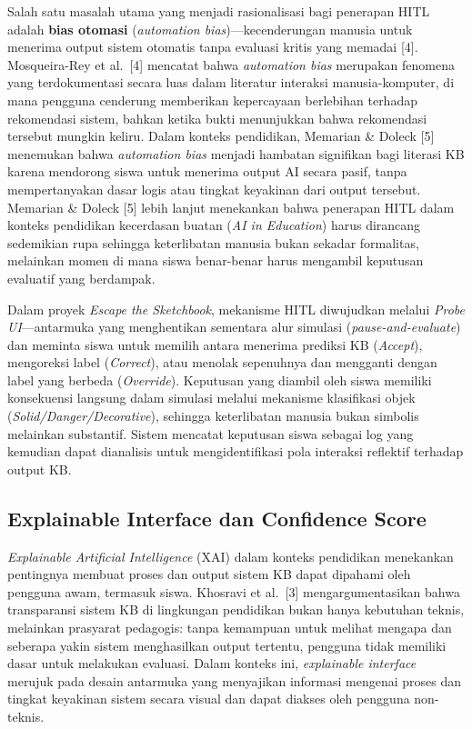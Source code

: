 Salah satu masalah utama yang menjadi rasionalisasi bagi penerapan HITL adalah \textbf{bias otomasi} (\textit{automation bias})---kecenderungan manusia untuk menerima output sistem otomatis tanpa evaluasi kritis yang memadai [4]. Mosqueira-Rey et al.\ [4] mencatat bahwa \textit{automation bias} merupakan fenomena yang terdokumentasi secara luas dalam literatur interaksi manusia-komputer, di mana pengguna cenderung memberikan kepercayaan berlebihan terhadap rekomendasi sistem, bahkan ketika bukti menunjukkan bahwa rekomendasi tersebut mungkin keliru. Dalam konteks pendidikan, Memarian \& Doleck [5] menemukan bahwa \textit{automation bias} menjadi hambatan signifikan bagi literasi KB karena mendorong siswa untuk menerima output AI secara pasif, tanpa mempertanyakan dasar logis atau tingkat keyakinan dari output tersebut. Memarian \& Doleck [5] lebih lanjut menekankan bahwa penerapan HITL dalam konteks pendidikan kecerdasan buatan (\textit{AI in Education}) harus dirancang sedemikian rupa sehingga keterlibatan manusia bukan sekadar formalitas, melainkan momen di mana siswa benar-benar harus mengambil keputusan evaluatif yang berdampak.

Dalam proyek \textit{Escape the Sketchbook}, mekanisme HITL diwujudkan melalui \textit{Probe UI}---antarmuka yang menghentikan sementara alur simulasi (\textit{pause-and-evaluate}) dan meminta siswa untuk memilih antara menerima prediksi KB (\textit{Accept}), mengoreksi label (\textit{Correct}), atau menolak sepenuhnya dan mengganti dengan label yang berbeda (\textit{Override}). Keputusan yang diambil oleh siswa memiliki konsekuensi langsung dalam simulasi melalui mekanisme klasifikasi objek (\textit{Solid/Danger/Decorative}), sehingga keterlibatan manusia bukan simbolis melainkan substantif. Sistem mencatat keputusan siswa sebagai log yang kemudian dapat dianalisis untuk mengidentifikasi pola interaksi reflektif terhadap output KB.

\subsection{Explainable Interface dan Confidence Score}
\label{subsec:explainable-interface}

\textit{Explainable Artificial Intelligence} (XAI) dalam konteks pendidikan menekankan pentingnya membuat proses dan output sistem KB dapat dipahami oleh pengguna awam, termasuk siswa. Khosravi et al.\ [3] mengargumentasikan bahwa transparansi sistem KB di lingkungan pendidikan bukan hanya kebutuhan teknis, melainkan prasyarat pedagogis: tanpa kemampuan untuk melihat mengapa dan seberapa yakin sistem menghasilkan output tertentu, pengguna tidak memiliki dasar untuk melakukan evaluasi. Dalam konteks ini, \textit{explainable interface} merujuk pada desain antarmuka yang menyajikan informasi mengenai proses dan tingkat keyakinan sistem secara visual dan dapat diakses oleh pengguna non-teknis.

